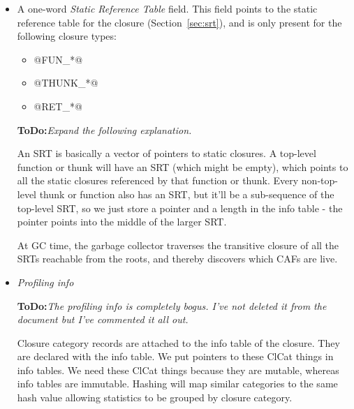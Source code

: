 \documentclass[11pt]{article}
\newcommand{\ToDo}[1]{{{\bf ToDo:}\sl #1}}
\newcommand{\secref}[1]{Section~\ref{sec:#1}}
\begin{document}
\begin{itemize}
\begin{itemize}
\item If an activation record is longer than 32 words, then the layout
field contains a pointer to a bitmap record, consisting of a length
field followed by two or more bitmap words.  This layout information
is used for @RET_BIG@ and @RET_VEC_BIG@ closures.

\item Selector Thunks (\secref{THUNK_SELECTOR}) use the closure
layout field to hold the selector index, since the layout is always
known (the closure contains a single pointer field).
\end{itemize}

\item A one-word {\em Static Reference Table} field.  This field
points to the static reference table for the closure (\secref{srt}),
and is only present for the following closure types:

	\begin{itemize}
	\item @FUN_*@
	\item @THUNK_*@
	\item @RET_*@
	\end{itemize}

\ToDo{Expand the following explanation.}

An SRT is basically a vector of pointers to static closures.  A
top-level function or thunk will have an SRT (which might be empty),
which points to all the static closures referenced by that function or
thunk.  Every non-top-level thunk or function also has an SRT, but
it'll be a sub-sequence of the top-level SRT, so we just store a
pointer and a length in the info table - the pointer points into the
middle of the larger SRT.

At GC time, the garbage collector traverses the transitive closure of
all the SRTs reachable from the roots, and thereby discovers which
CAFs are live.
  
\item \emph{Profiling info\/}

\ToDo{The profiling info is completely bogus.  I've not deleted it
from the document but I've commented it all out.}

\iffalse

Closure category records are attached to the info table of the
closure. They are declared with the info table. We put pointers to
these ClCat things in info tables.  We need these ClCat things because
they are mutable, whereas info tables are immutable.  Hashing will map
similar categories to the same hash value allowing statistics to be
grouped by closure category.


\end{itemize}
\end{document}
